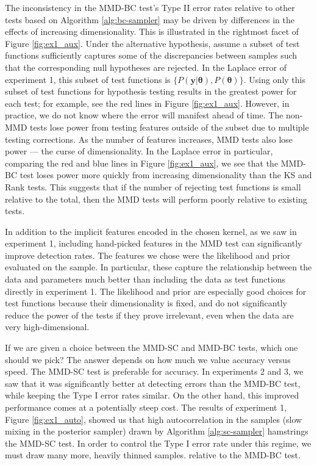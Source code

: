 \documentclass[a4paper,12pt]{article}
\begin{document}
The inconsistency in the MMD-BC test's Type II error rates relative to other tests based on Algorithm \ref{alg:bc-sampler} may be driven by differences in the effects of increasing dimensionality. This is illustrated in the rightmost facet of Figure \ref{fig:ex1_aux}. Under the alternative hypothesis, assume a subset of test functions sufficiently captures some of the discrepancies between samples such that the corresponding null hypotheses are rejected. In the Laplace error of experiment 1, this subset of test functions is $\{P(\mathbf{y}|\mathbf{\theta}), P(\mathbf{\theta})\}$. Using only this subset of test functions for hypothesis testing results in the greatest power for each test; for example, see the red lines in Figure \ref{fig:ex1_aux}. However, in practice, we do not know where the error will manifest ahead of time. The non-MMD tests lose power from testing features outside of the subset due to multiple testing corrections. As the number of features increases, MMD tests also lose power \cite{reddi_decreasing_2014} --- the curse of dimensionality. In the Laplace error in particular, comparing the red and blue lines in Figure \ref{fig:ex1_aux}, we see that the MMD-BC test loses power more quickly from increasing dimensionality than the KS and Rank tests. This suggests that if the number of rejecting test functions is small relative to the total, then the MMD tests will perform poorly relative to existing tests. 

In addition to the implicit features encoded in the chosen kernel, as we saw in experiment 1, including hand-picked features in the MMD test can significantly improve detection rates. The features we chose were the likelihood and prior evaluated on the sample. In particular, these capture the relationship between the data and parameters much better than including the data as test functions directly in experiment 1. The likelihood and prior are especially good choices for test functions because their dimensionality is fixed, and do not significantly reduce the power of the tests if they prove irrelevant, even when the data are very high-dimensional.

If we are given a choice between the MMD-SC and MMD-BC tests, which one should we pick? The answer depends on how much we value accuracy versus speed. The MMD-SC test is preferable for accuracy. In experiments 2 and 3, we saw that it was significantly better at detecting errors than the MMD-BC test, while keeping the Type I error rates similar. On the other hand, this improved performance comes at a potentially steep cost. The results of experiment 1, Figure \ref{fig:ex1_auto}, showed us that high autocorrelation in the samples (slow mixing in the posterior sampler) drawn by Algorithm \ref{alg:sc-sampler} hamstrings the MMD-SC test. In order to control the Type I error rate under this regime, we must draw many more, heavily thinned samples. relative to the MMD-BC test. 
\end{document}
